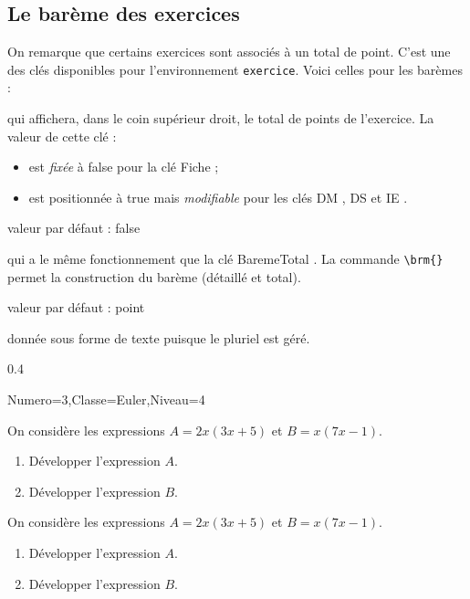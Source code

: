 \documentclass[12pt,french]{article}
\newcommand\Cle[1]{%
  {\sffamily\textlangle #1\textrangle}%
}%
\newcommand{\Defaut}[1]{%
\hfill valeur par défaut : {\sffamily #1}\par%
}%
\newenvironment{Description}
               {\list{}{\labelwidth0pt \leftmargin0pt \itemindent-\leftmargin
                        \let\makelabel\Descriptionlabel}}
               {\endlist}
\newcommand*\Descriptionlabel[1]{\hspace\labelsep
                                \normalfont\bfseries #1}
\begin{document}
\subsection*{Le barème des exercices}
On remarque que certains exercices sont associés à un total de point. C'est une des clés disponibles pour l'environnement \lstinline!exercice!. Voici celles pour les barèmes :
\begin{Description}
\item[La clé \Cle{BaremeTotal}] qui affichera, dans le coin supérieur droit, le total de points de l'exercice. La valeur de cette clé :
  \begin{itemize}
  \item est {\em fixée} à {\sffamily false} pour la clé \Cle{Fiche};
  \item est positionnée à {\sffamily true} mais {\em modifiable} pour les clés \Cle{DM}, \Cle{DS} et \Cle{IE}.
  \end{itemize}
\item[La clé \Cle{BaremeDetaille}]\Defaut{false}\par qui a le même fonctionnement que la clé \Cle{BaremeTotal}.
  La commande \lstinline!\brm{}! permet la construction du barème (détaillé et total).
\item[La clé \Cle{MotPoint}]\Defaut{point}\par donnée sous forme de texte puisque le pluriel est géré.
  \begin{Codes}{0.4}{}
\begin{Maquette}[DS]{Numero=3,Classe=Euler,Niveau=4}
  \begin{exercice}  %
    On considère les expressions $A=2x(3x+5)$ et $B=x(7x-1)$.
    \begin{enumerate}
    \item{} Développer l'expression $A$.
    \item{} Développer l'expression $B$.
    \end{enumerate}
  \end{exercice}
  \begin{exercice}[BaremeDetaille]  %
    On considère les expressions $A=2x(3x+5)$ et $B=x(7x-1)$.
    \begin{enumerate}
    \item{} Développer l'expression $A$.
    \item{} Développer l'expression $B$.
    \end{enumerate}

\end{exercice}
\end{Maquette}
\end{Codes}
\end{Description}
\end{document}
